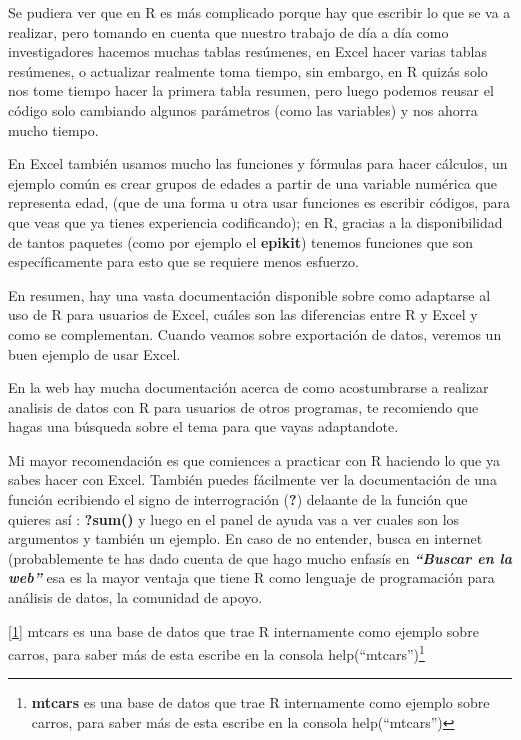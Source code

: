 \documentclass[
  letterpaper,
  DIV=11,
  numbers=noendperiod]{scrreprt}
\begin{document}
Se pudiera ver que en R es más complicado porque hay que escribir lo que
se va a realizar, pero tomando en cuenta que nuestro trabajo de día a
día como investigadores hacemos muchas tablas resúmenes, en Excel hacer
varias tablas resúmenes, o actualizar realmente toma tiempo, sin
embargo, en R quizás solo nos tome tiempo hacer la primera tabla
resumen, pero luego podemos reusar el código solo cambiando algunos
parámetros (como las variables) y nos ahorra mucho tiempo.

En Excel también usamos mucho las funciones y fórmulas para hacer
cálculos, un ejemplo común es crear grupos de edades a partir de una
variable numérica que representa edad, (que de una forma u otra usar
funciones es escribir códigos, para que veas que ya tienes experiencia
codificando); en R, gracias a la disponibilidad de tantos paquetes (como
por ejemplo el \textbf{epikit}) tenemos funciones que son
específicamente para esto que se requiere menos esfuerzo.

En resumen, hay una vasta documentación disponible sobre como adaptarse
al uso de R para usuarios de Excel, cuáles son las diferencias entre R y
Excel y como se complementan. Cuando veamos sobre exportación de datos,
veremos un buen ejemplo de usar Excel.

En la web hay mucha documentación acerca de como acostumbrarse a
realizar analisis de datos con R para usuarios de otros programas, te
recomiendo que hagas una búsqueda sobre el tema para que vayas
adaptandote.

Mi mayor recomendación es que comiences a practicar con R haciendo lo
que ya sabes hacer con Excel. También puedes fácilmente ver la
documentación de una función ecribiendo el signo de interrogración
(\textbf{?}) delaante de la función que quieres así : \textbf{?sum()} y
luego en el panel de ayuda vas a ver cuales son los argumentos y también
un ejemplo. En caso de no entender, busca en internet (probablemente te
has dado cuenta de que hago mucho enfasís en \textbf{\emph{``Buscar en
la web''}} esa es la mayor ventaja que tiene R como lenguaje de
programación para análisis de datos, la comunidad de apoyo.

\hyperref[_ftnref1]{{[}1{]}} mtcars es una base de datos que trae R
internamente como ejemplo sobre carros, para saber más de esta escribe
en la consola help(``mtcars'')\footnote{\textbf{mtcars} es una base de
  datos que trae R internamente como ejemplo sobre carros, para saber
  más de esta escribe en la consola help(``mtcars'')}

\end{document}
